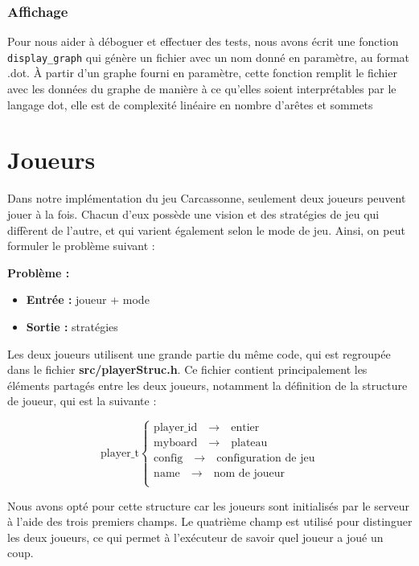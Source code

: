 \documentclass[10pt]{article}
\begin{document}
\subsubsection{Affichage}

Pour nous aider à déboguer et effectuer des tests, nous avons écrit une fonction \texttt{display\_graph} qui génère un fichier avec un nom donné en paramètre, au format .dot. À partir d'un graphe fourni en paramètre, cette fonction remplit le fichier avec les données du graphe de manière à ce qu'elles soient interprétables par le langage dot, elle est de complexité linéaire en nombre d'arêtes et sommets




\section{Joueurs}
Dans notre implémentation du jeu Carcassonne, seulement deux joueurs peuvent jouer à la fois. Chacun d'eux possède une vision et des stratégies de jeu qui diffèrent de l'autre, et qui varient également selon le mode de jeu. Ainsi, on peut formuler le problème suivant :

\textbf{Problème :}
\begin{itemize}
\item \textbf{Entrée :} joueur + mode
\item \textbf{Sortie :} stratégies
\end{itemize}
Les deux joueurs utilisent une grande partie du même code, qui est regroupée dans le fichier \textbf{src/playerStruc.h}. Ce fichier contient principalement les éléments partagés entre les deux joueurs, notamment la définition de la structure de joueur, qui est la suivante :


\[
\text{player\_t} \left\{
\begin{array}{l}
\text{player\_id} \quad \rightarrow \quad \text{entier}\\
\text{myboard} \quad \rightarrow \quad \text{plateau}\\
\text{config} \quad \rightarrow \quad \text{configuration de jeu}\\
\text{name} \quad \rightarrow \quad \text{nom de joueur}\\ 
\end{array}
\right.
\]

Nous avons opté pour cette structure car les joueurs sont initialisés par le serveur à l'aide des trois premiers champs. Le quatrième champ est utilisé pour distinguer les deux joueurs, ce qui permet à l'exécuteur de savoir quel joueur a joué un coup.\\
\end{document}

